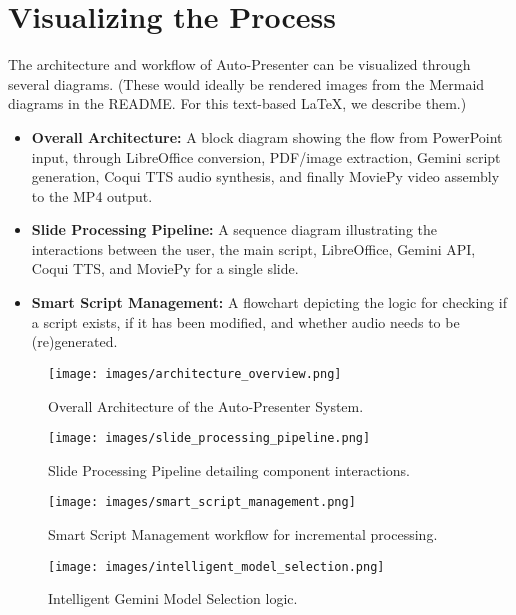 \documentclass{article}
\begin{document}
\section{Visualizing the Process}
The architecture and workflow of Auto-Presenter can be visualized through several diagrams. (These would ideally be rendered images from the Mermaid diagrams in the README. For this text-based LaTeX, we describe them.)
\begin{itemize}
    \item \textbf{Overall Architecture:} A block diagram showing the flow from PowerPoint input, through LibreOffice conversion, PDF/image extraction, Gemini script generation, Coqui TTS audio synthesis, and finally MoviePy video assembly to the MP4 output.
    \item \textbf{Slide Processing Pipeline:} A sequence diagram illustrating the interactions between the user, the main script, LibreOffice, Gemini API, Coqui TTS, and MoviePy for a single slide.
    \item \textbf{Smart Script Management:} A flowchart depicting the logic for checking if a script exists, if it has been modified, and whether audio needs to be (re)generated.
\end{itemize}
\begin{figure}[htbp]
    \centering
    \texttt{[image: images/architecture\_overview.png]}
    \caption{Overall Architecture of the Auto-Presenter System.}
    \label{fig:architecture_overview}
\end{figure}

\begin{figure}[htbp]
    \centering
    \texttt{[image: images/slide\_processing\_pipeline.png]}
    \caption{Slide Processing Pipeline detailing component interactions.}
    \label{fig:slide_processing_pipeline}
\end{figure}

\begin{figure}[htbp]
    \centering
    \texttt{[image: images/smart\_script\_management.png]}
    \caption{Smart Script Management workflow for incremental processing.}
    \label{fig:smart_script_management}
\end{figure}

\begin{figure}[htbp]
    \centering
    \texttt{[image: images/intelligent\_model\_selection.png]}
    \caption{Intelligent Gemini Model Selection logic.}
    \label{fig:intelligent_model_selection}
\end{figure}
\end{document}
